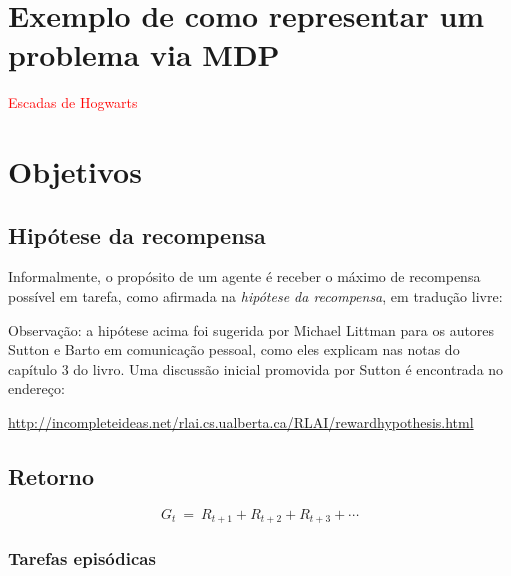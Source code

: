 \documentclass{article}
\begin{document}
    \section{Exemplo de como representar um problema via MDP}
    
        \textcolor{red}{Escadas de Hogwarts}
    
    \section{Objetivos}
    
        \subsection{Hipótese da recompensa}
    
            Informalmente, o propósito de um agente é receber o máximo de recompensa possível em tarefa, como afirmada na \emph{hipótese da recompensa}, em tradução livre:
            \begin{center}
            \noindent{}%
            \end{center}
            
            Observação: a hipótese acima foi sugerida por Michael Littman para os autores Sutton e Barto em comunicação pessoal, como eles explicam nas notas do capítulo 3 do livro. Uma discussão inicial promovida por Sutton é encontrada no endereço:
            
            \url{http://incompleteideas.net/rlai.cs.ualberta.ca/RLAI/rewardhypothesis.html}
        
        \subsection{Retorno}

            \begin{equation}
                G_t \ = \ R_{t+1} + R_{t+2} + R_{t+3} + \cdots
            \end{equation}

            \subsubsection{Tarefas episódicas}
\end{document}
